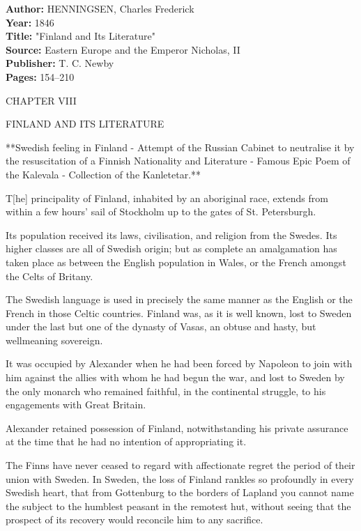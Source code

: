 \documentclass[10pt,a4paper]{article}
\begin{document}
\noindent
{\small
\textbf{Author:} HENNINGSEN, Charles Frederick\\
\textbf{Year:} 1846\\
\textbf{Title:} "Finland and Its Literature"\\
\textbf{Source:} Eastern Europe and the Emperor Nicholas, II\\
\textbf{Publisher:} T. C. Newby\\
\textbf{Pages:} 154--210
}

\vspace{1em}

CHAPTER VIII

FINLAND AND ITS LITERATURE

**Swedish feeling in Finland - Attempt of the Russian Cabinet to neutralise it by the resuscitation of a Finnish Nationality and Literature - Famous Epic Poem of the Kalevala - Collection of the Kanletetar.**

T[he] principality of Finland, inhabited by an aboriginal race, extends from within a few hours' sail of Stockholm up to the gates of St. Petersburgh.

Its population received its laws, civilisation, and religion from the Swedes. Its higher classes are all of Swedish origin; but as complete an amalgamation has taken place as between the English population in Wales, or the French amongst the Celts of Britany.

The Swedish language is used in precisely the same manner as the English or the French in those Celtic countries. Finland was, as it is well known, lost to Sweden under the last but one of the dynasty of Vasas, an obtuse and hasty, but wellmeaning sovereign.

It was occupied by Alexander when he had been forced by Napoleon to join with him against the allies with whom he had begun the war, and lost to Sweden by the only monarch who remained faithful, in the continental struggle, to his engagements with Great Britain.

Alexander retained possession of Finland, notwithstanding his private assurance at the time that he had no intention of appropriating it.

The Finns have never ceased to regard with affectionate regret the period of their union with Sweden. In Sweden, the loss of Finland rankles so profoundly in every Swedish heart, that from Gottenburg to the borders of Lapland you cannot name the subject to the humblest peasant in the remotest hut, without seeing that the prospect of its recovery would reconcile him to any sacrifice.
\end{document}
